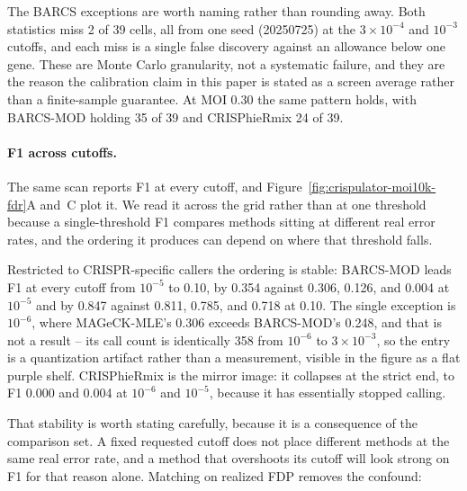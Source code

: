 The BARCS exceptions are worth naming rather than rounding away.  Both
statistics miss 2 of 39 cells, all from one seed (20250725) at the $3\times
10^{-4}$ and $10^{-3}$ cutoffs, and each miss is a single false discovery
against an allowance below one gene.  These are Monte Carlo granularity, not a
systematic failure, and they are the reason the calibration claim in this
paper is stated as a screen average rather than a finite-sample guarantee.  At
MOI 0.30 the same pattern holds, with BARCS-MOD holding 35 of 39 and
CRISPhieRmix 24 of 39.

\paragraph{F1 across cutoffs.}
The same scan reports F1 at every cutoff, and
Figure~\ref{fig:crispulator-moi10k-fdr}A and~C plot it.  We read it across the
grid rather than at one threshold because a single-threshold F1 compares
methods sitting at different real error rates, and the ordering it produces
can depend on where that threshold falls.

Restricted to CRISPR-specific callers the ordering is stable: BARCS-MOD leads
F1 at every cutoff from $10^{-5}$ to 0.10, by 0.354 against 0.306, 0.126, and
0.004 at $10^{-5}$ and by 0.847 against 0.811, 0.785, and 0.718 at 0.10.  The
single exception is $10^{-6}$, where MAGeCK-MLE's 0.306 exceeds BARCS-MOD's
0.248, and that is not a result -- its call count is identically 358 from
$10^{-6}$ to $3\times 10^{-3}$, so the entry is a quantization artifact rather
than a measurement, visible in the figure as a flat purple shelf.
CRISPhieRmix is the mirror image: it collapses at the strict end, to F1 0.000
and 0.004 at $10^{-6}$ and $10^{-5}$, because it has essentially stopped
calling.

That stability is worth stating carefully, because it is a consequence of the
comparison set.  A fixed requested cutoff does not place different methods at
the same real error rate, and a method that overshoots its cutoff will look
strong on F1 for that reason alone.  Matching on realized FDP removes the
confound:

